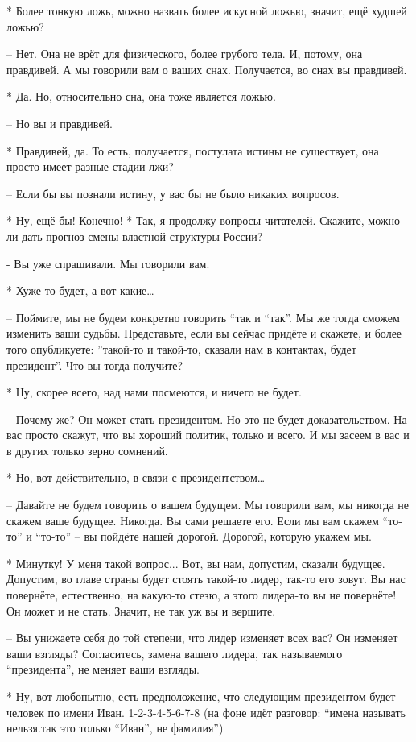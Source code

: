  * Более тонкую ложь, можно назвать более искусной ложью, значит, ещё худшей ложью?

 – Нет. Она не врёт для физического, более грубого тела. И, потому, она правдивей. А мы говорили вам о ваших снах. Получается, во снах вы правдивей.

 * Да. Но, относительно сна, она тоже является ложью.

 – Но вы и правдивей.

 * Правдивей, да. То есть, получается, постулата истины не существует, она просто имеет разные стадии лжи?

 – Если бы вы познали истину, у вас бы не было никаких вопросов.

 * Ну, ещё бы! Конечно!
 * Так, я продолжу вопросы читателей. Скажите, можно ли дать прогноз смены властной структуры России?

 - Вы уже спрашивали. Мы говорили вам.

 * Хуже-то будет, а вот какие…

 – Поймите, мы не будем конкретно говорить “так и “так”. Мы же тогда сможем изменить ваши судьбы. Представьте, если вы сейчас придёте и скажете, и более того опубликуете: ”такой-то и такой-то, сказали нам в контактах, будет президент”. Что вы тогда получите?

 * Ну, скорее всего, над нами посмеются, и ничего не будет.

 – Почему же? Он может стать президентом. Но это не будет доказательством. На вас просто скажут, что вы хороший политик, только и всего. И мы засеем в вас и в других только зерно сомнений.

 * Но, вот действительно, в связи с президентством…

 – Давайте не будем говорить о вашем будущем. Мы говорили вам, мы никогда не скажем ваше будущее. Никогда. Вы сами решаете его. Если мы вам скажем “то-то” и “то-то” – вы пойдёте нашей дорогой. Дорогой, которую укажем мы.

 * Минутку! У меня такой вопрос... Вот, вы нам, допустим, сказали будущее. Допустим, во главе страны будет стоять такой-то лидер, так-то его зовут. Вы нас повернёте, естественно, на какую-то стезю, а этого лидера-то  вы не повернёте! Он может и не стать. Значит, не так уж вы и вершите.

 – Вы унижаете себя до той степени, что лидер изменяет всех вас? Он изменяет ваши взгляды? Согласитесь, замена вашего лидера, так называемого “президента”, не меняет ваши взгляды.

 * Ну, вот любопытно, есть предположение, что следующим президентом будет человек по имени Иван.
 1-2-3-4-5-6-7-8 (на фоне идёт разговор: “имена называть нельзя.так это только “Иван”, не фамилия”)

